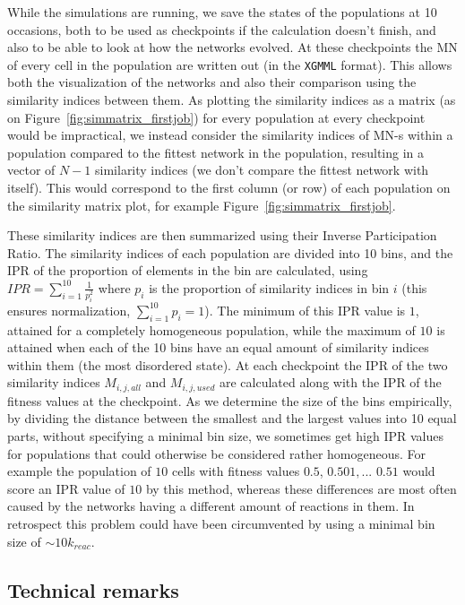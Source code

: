 \documentclass[a4paper,12pt]{article}
\begin{document}
While the simulations are running, we save the states of the populations at 10 occasions, both to be used as checkpoints if the calculation doesn't finish, and also to be able to look at how the networks evolved. At these checkpoints the MN of every cell in the population are written out (in the \texttt{XGMML} format). This allows both the visualization of the networks and also their comparison using the similarity indices between them. As plotting the similarity indices as a matrix (as on Figure~\ref{fig:simmatrix_firstjob}) for every population at every checkpoint would be impractical, we instead consider the similarity indices of MN-s within a population compared to the fittest network in the population, resulting in a vector of $N-1$ similarity indices (we don't compare the fittest network with itself). This would correspond to the first column (or row) of each population on the similarity matrix plot, for example Figure~\ref{fig:simmatrix_firstjob}.

These similarity indices are then summarized using their Inverse Participation Ratio. The similarity indices of each population are divided into 10 bins, and the IPR of the proportion of elements in the bin are calculated, using $IPR= \sum^{10}_{i=1} \frac{1}{p_i^2} $ where $p_i$ is the proportion of similarity indices in bin $i$ (this ensures normalization, $ \sum^{10}_{i=1} p_i=1$). The minimum of this IPR value is $1$, attained for a completely homogeneous population, while the maximum of $10$ is attained when each of the 10 bins have an equal amount of similarity indices within them (the most disordered state). At each checkpoint the IPR of the two similarity indices $M_{i,j,all}$ and $M_{i,j,used}$ are calculated along with the IPR of the fitness values at the checkpoint. As we determine the size of the bins empirically, by dividing the distance between the smallest and the largest values into 10 equal parts, without specifying a minimal bin size, we sometimes get high IPR values for populations that could otherwise be considered rather homogeneous. For example the population of $10$ cells with fitness values $0.5$, $0.501, ...$ $0.51$ would score an IPR value of $10$ by this method, whereas these differences are most often caused by the networks having a different amount of reactions in them. In retrospect this problem could have been circumvented by using a minimal bin size of $\sim 10 k_{reac}$.




\subsection{Technical remarks}
\label{sub:technical_bits}
\end{document}
